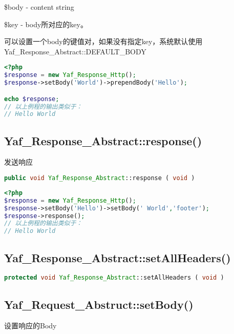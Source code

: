 \begin{compactitem}
\item \$body - content string
\item \$key - body所对应的key。

可以设置一个body的键值对，如果没有指定key，系统默认使用Yaf\_Response\_Abstract::DEFAULT\_BODY
\end{compactitem}

\begin{lstlisting}[language=PHP]
<?php
$response = new Yaf_Response_Http();
$response->setBody('World')->prependBody('Hello');

echo $response;
// 以上例程的输出类似于：
// Hello World
\end{lstlisting}

\subsection{Yaf\_Response\_Abstract::response()}

发送响应


\begin{lstlisting}[language=PHP]
public void Yaf_Response_Abstract::response ( void )
\end{lstlisting}

\begin{lstlisting}[language=PHP]
<?php
$response = new Yaf_Response_Http();
$response->setBody('Hello')->setBody(' World','footer');
$response->response();
// 以上例程的输出类似于：
// Hello World
\end{lstlisting}



\subsection{Yaf\_Response\_Abstract::setAllHeaders()}





\begin{lstlisting}[language=PHP]
protected void Yaf_Response_Abstract::setAllHeaders ( void )
\end{lstlisting}


\subsection{Yaf\_Request\_Abstruct::setBody()}

设置响应的Body



